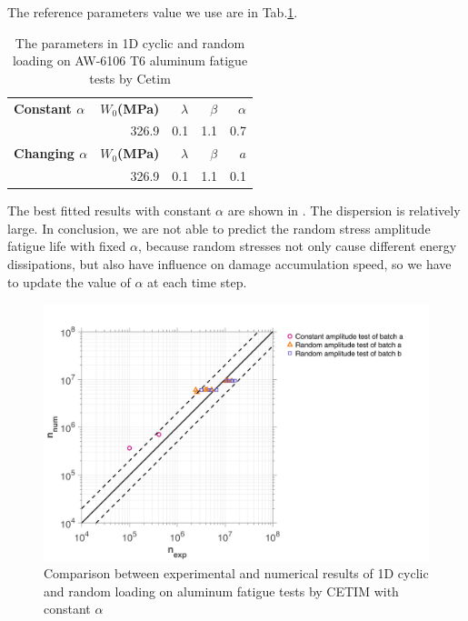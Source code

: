 The reference parameters value we use are in Tab.\ref{tab.cetim.alp}.  
\begin{table}[!h]
\centering
\begin{tabular}{lrrrr}
\hline
\textbf{Constant $\alpha$} & \textbf{$W_0$(MPa)} & \textbf{$\lambda$} & \textbf{$\beta$}  & \textbf{$\alpha$}\\
& 326.9         & 0.1               & 1.1            & 0.7                         \\ \hline
\textbf{Changing $\alpha$} & \textbf{$W_0$(MPa)} & \textbf{$\lambda$} & \textbf{$\beta$}  & \textbf{$a$}\\
& 326.9         & 0.1               & 1.1            & 0.1                         \\ \hline
\end{tabular}
\caption{The parameters in 1D cyclic and random loading on AW-6106 T6
aluminum fatigue tests by Cetim}
\label{tab.cetim.alp}
\end{table}

The best fitted results with constant $\alpha$ are shown in . The dispersion is relatively large. In conclusion, we are not able to predict the random stress amplitude fatigue life with fixed $\alpha$, because random stresses not only cause different energy dissipations, but also have influence on damage accumulation speed, so we have to update the value of $\alpha$ at each time step. 

\begin{figure}[!h]
\centering
\includegraphics[width=\textwidth]{figures//Cetim_err_alpfix.png} 
\caption{Comparison between experimental and numerical results of 1D cyclic and random loading on aluminum fatigue tests by CETIM with constant $\alpha$}
\label{fig.Cetimerralpfix}
\end{figure}

